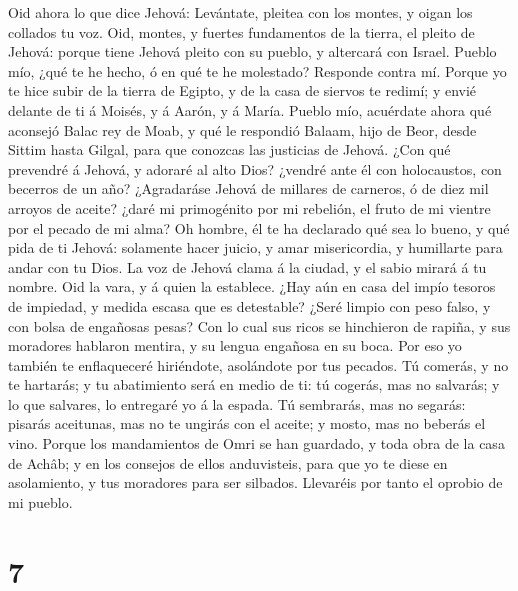  Oid ahora lo que dice Jehová: Levántate, pleitea con los
montes, y oigan los collados tu voz.  Oid, montes, y fuertes
fundamentos de la tierra, el pleito de Jehová: porque tiene Jehová
pleito con su pueblo, y altercará con Israel.  Pueblo mío,
¿qué te he hecho, ó en qué te he molestado? Responde contra mí.
 Porque yo te hice subir de la tierra de Egipto, y de la
casa de siervos te redimí; y envié delante de ti á Moisés, y á Aarón, y
á María.  Pueblo mío, acuérdate ahora qué aconsejó Balac rey
de Moab, y qué le respondió Balaam, hijo de Beor, desde Sittim hasta
Gilgal, para que conozcas las justicias de Jehová.  ¿Con qué
prevendré á Jehová, y adoraré al alto Dios? ¿vendré ante él con
holocaustos, con becerros de un año?  ¿Agradaráse Jehová de
millares de carneros, ó de diez mil arroyos de aceite? ¿daré mi
primogénito por mi rebelión, el fruto de mi vientre por el pecado de mi
alma?  Oh hombre, él te ha declarado qué sea lo bueno, y qué
pida de ti Jehová: solamente hacer juicio, y amar misericordia, y
humillarte para andar con tu Dios.  La voz de Jehová clama á
la ciudad, y el sabio mirará á tu nombre. Oid la vara, y á quien la
establece.  ¿Hay aún en casa del impío tesoros de impiedad,
y medida escasa que es detestable?  ¿Seré limpio con peso
falso, y con bolsa de engañosas pesas?  Con lo cual sus
ricos se hinchieron de rapiña, y sus moradores hablaron mentira, y su
lengua engañosa en su boca.  Por eso yo también te
enflaqueceré hiriéndote, asolándote por tus pecados.  Tú
comerás, y no te hartarás; y tu abatimiento será en medio de ti: tú
cogerás, mas no salvarás; y lo que salvares, lo entregaré yo á la
espada.  Tú sembrarás, mas no segarás: pisarás aceitunas,
mas no te ungirás con el aceite; y mosto, mas no beberás el vino.
 Porque los mandamientos de Omri se han guardado, y toda
obra de la casa de Achâb; y en los consejos de ellos anduvisteis, para
que yo te diese en asolamiento, y tus moradores para ser silbados.
Llevaréis por tanto el oprobio de mi pueblo.

\hypertarget{section-6}{%
\section{7}\label{section-6}}

